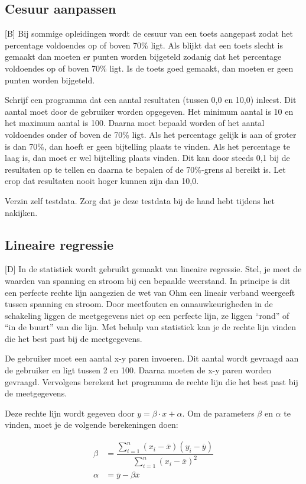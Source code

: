 \documentclass[a4paper,10pt,fleqn,twoside]{article}
\begin{document}
\subsection{Cesuur aanpassen}[B]
Bij sommige opleidingen wordt de cesuur van een toets aangepast zodat het percentage voldoendes op of boven 70\% ligt. Als blijkt dat een toets slecht is gemaakt dan moeten er punten worden bijgeteld zodanig dat het percentage voldoendes op of boven 70\% ligt. Is de toets goed gemaakt, dan moeten er geen punten worden bijgeteld.

Schrijf een programma dat een aantal resultaten (tussen 0,0 en 10,0) inleest. Dit aantal moet door de gebruiker worden opgegeven. Het minimum aantal is 10 en het maximum aantal is 100. Daarna moet bepaald worden of het aantal voldoendes onder of boven de 70\% ligt. Als het percentage gelijk is aan of groter is dan 70\%, dan hoeft er geen bijtelling plaats te vinden. Als het percentage te laag is, dan moet er wel bijtelling plaats vinden. Dit kan door steeds 0,1 bij de resultaten op te tellen en daarna te bepalen of de 70\%-grens al bereikt is. Let erop dat resultaten nooit hoger kunnen zijn dan 10,0.

Verzin zelf testdata. Zorg dat je deze testdata bij de hand hebt tijdens het nakijken.

\subsection{Lineaire regressie}[D]
In de statistiek wordt gebruikt gemaakt van lineaire regressie. Stel, je meet de waarden van spanning en stroom bij een bepaalde weerstand. In principe is dit een perfecte rechte lijn aangezien de wet van Ohm een lineair verband weergeeft tussen spanning en stroom. Door meetfouten en onnauwkeurigheden in de schakeling liggen de meetgegevens niet op een perfecte lijn, ze liggen ``rond'' of ``in de buurt'' van die lijn. Met behulp van statistiek kan je de rechte lijn vinden die het best past bij de meetgegevens.

De gebruiker moet een aantal x-y paren invoeren. Dit aantal wordt gevraagd aan de gebruiker en ligt tussen 2 en 100. Daarna moeten de x-y paren worden gevraagd. Vervolgens berekent het programma de rechte lijn die het best past bij de meetgegevens. 

Deze rechte lijn wordt gegeven door $y = \beta\cdot x + \alpha$. Om de parameters $\beta$ en $\alpha$ te vinden, moet je de volgende berekeningen doen:

\begin{align*}
\beta &= \dfrac{\sum\limits_{i=1}^{n}\left(x_i-\overline{x}\right)\left(y_i-\overline{y}\right)}{\sum\limits_{i=1}^{n}\left(x_i-\overline{x}\right)^2} \\
\alpha &= \overline{y} - \beta\overline{x}
\end{align*}
\end{document}
